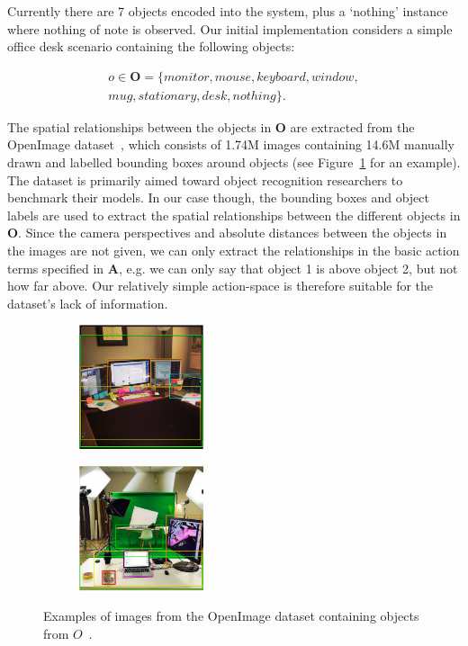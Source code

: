\documentclass[a4paper, twoside]{article}
\begin{document}
Currently there are 7 objects encoded into the system, plus a `nothing' instance where nothing of note is observed. Our initial implementation considers a simple office desk scenario containing the following objects:

\begin{equation}
  \begin{aligned}
    o\in \mathbf{O} = \{monitor, mouse, keyboard, window,\\mug, stationary, desk, nothing\}.
  \end{aligned}
\end{equation}

The spatial relationships between the objects in $\mathbf{O}$ are extracted from the OpenImage dataset~\cite{openimages}, which consists of 1.74M images containing 14.6M manually drawn and labelled bounding boxes around objects (see Figure~\ref{fig:openimage-example} for an example). The dataset is primarily aimed toward object recognition researchers to benchmark their models. In our case though, the bounding boxes and object labels are used to extract the spatial relationships between the different objects in $\mathbf{O}$. Since the camera perspectives and absolute distances between the objects in the images are not given, we can only extract the relationships in the basic action terms specified in $\mathbf{A}$, e.g. we can only say that object 1 is above object 2, but not how far above. Our relatively simple action-space is therefore suitable for the dataset's lack of information. 

\begin{figure}
  \centering
  \begin{subfigure}
    \centering
    \includegraphics[width=0.4\textwidth]{figures/desk_example.png}
  \end{subfigure}
  \begin{subfigure}
    \centering
    \includegraphics[width=0.4\textwidth]{figures/mug_example.png}
  \end{subfigure}
  \caption{Examples of images from the OpenImage dataset containing objects from $\mathit{O}$~\cite{openimages}. }\label{fig:openimage-example}
\end{figure}
\end{document}
